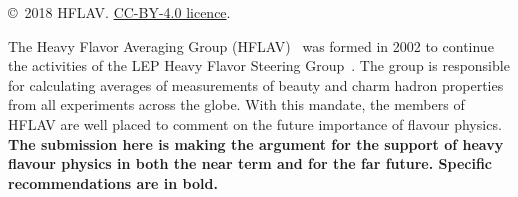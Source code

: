 \documentclass[12pt,a4paper]{article}
\def\papercopyright{2018 HFLAV} %
\def\paperlicence{CC-BY-4.0 licence}
\def\paperlicenceurl{https://creativecommons.org/licenses/by/4.0/}
\begin{document}
\author[18]{M.~Rama}
\author[26]{M.~Roney}
\author[27]{M.~Rotondo}
\author[28]{O.~Schneider}
\author[29]{C.~Schwanda}
\author[30]{A.~J.~Schwartz}
\author[31,32]{B.~Shwartz}
\author[10]{J.~Serrano}
\author[39]{A.~Soffer}
\author[18]{D.~Tonelli}
\author[36]{P.~Urquijo}
\author[37]{R.~Van Kooten}
\author[38]{J.~Yelton}

\maketitle

{\footnotesize 
\centerline{\copyright~\papercopyright. \href{\paperlicenceurl}{\paperlicence}.}}
\vspace*{1cm}

\renewcommand{\thefootnote}{\arabic{footnote}}
\setcounter{footnote}{0}



\pagestyle{plain} %
\setcounter{page}{1}

\linenumbers

\noindent The Heavy Flavor Averaging Group (HFLAV)~\cite{HFLAV16} was formed in 2002 to 
continue the activities of the LEP Heavy Flavor Steering 
Group~\cite{Abbaneo:2000ej_mod,*Abbaneo:2001bv_mod_cont}. 
The group is responsible for calculating averages of measurements of beauty and charm hadron properties from all experiments across the globe. With this mandate, the members of HFLAV are well 
placed to comment on the future importance of flavour physics. \textbf{The submission here is making the argument for the support of heavy flavour physics in both the near term and for the far future. Specific recommendations are in bold.}
\end{document}
